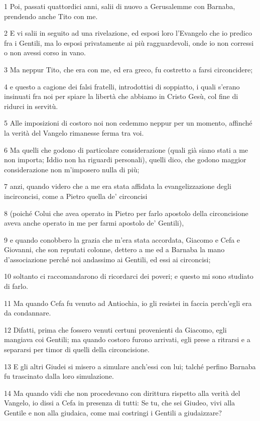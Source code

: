 \par 1 Poi, passati quattordici anni, salii di nuovo a Gerusalemme con Barnaba, prendendo anche Tito con me.
\par 2 E vi salii in seguito ad una rivelazione, ed esposi loro l'Evangelo che io predico fra i Gentili, ma lo esposi privatamente ai più ragguardevoli, onde io non corressi o non avessi corso in vano.
\par 3 Ma neppur Tito, che era con me, ed era greco, fu costretto a farsi circoncidere;
\par 4 e questo a cagione dei falsi fratelli, introdottisi di soppiatto, i quali s'erano insinuati fra noi per spiare la libertà che abbiamo in Cristo Gesù, col fine di ridurci in servitù.
\par 5 Alle imposizioni di costoro noi non cedemmo neppur per un momento, affinché la verità del Vangelo rimanesse ferma tra voi.
\par 6 Ma quelli che godono di particolare considerazione (quali già siano stati a me non importa; Iddio non ha riguardi personali), quelli dico, che godono maggior considerazione non m'imposero nulla di più;
\par 7 anzi, quando videro che a me era stata affidata la evangelizzazione degli incirconcisi, come a Pietro quella de' circoncisi
\par 8 (poiché Colui che avea operato in Pietro per farlo apostolo della circoncisione aveva anche operato in me per farmi apostolo de' Gentili),
\par 9 e quando conobbero la grazia che m'era stata accordata, Giacomo e Cefa e Giovanni, che son reputati colonne, dettero a me ed a Barnaba la mano d'associazione perché noi andassimo ai Gentili, ed essi ai circoncisi;
\par 10 soltanto ci raccomandarono di ricordarci dei poveri; e questo mi sono studiato di farlo.
\par 11 Ma quando Cefa fu venuto ad Antiochia, io gli resistei in faccia perch'egli era da condannare.
\par 12 Difatti, prima che fossero venuti certuni provenienti da Giacomo, egli mangiava coi Gentili; ma quando costoro furono arrivati, egli prese a ritrarsi e a separarsi per timor di quelli della circoncisione.
\par 13 E gli altri Giudei si misero a simulare anch'essi con lui; talché perfino Barnaba fu trascinato dalla loro simulazione.
\par 14 Ma quando vidi che non procedevano con dirittura rispetto alla verità del Vangelo, io dissi a Cefa in presenza di tutti: Se tu, che sei Giudeo, vivi alla Gentile e non alla giudaica, come mai costringi i Gentili a giudaizzare?
